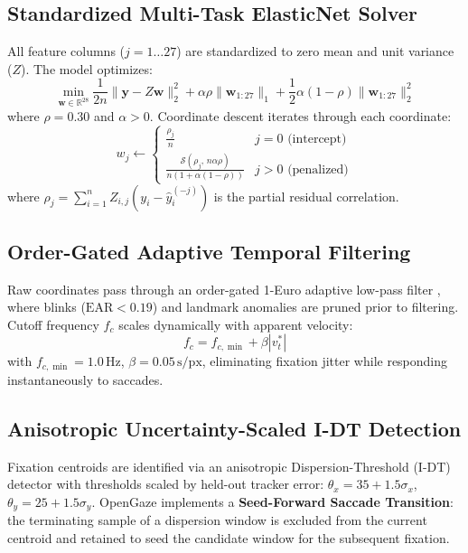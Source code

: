 \documentclass[10pt,twocolumn]{article}
\begin{document}
\subsection{Standardized Multi-Task ElasticNet Solver}
\label{subsec:elasticnet}
All feature columns ($j = 1 \dots 27$) are standardized to zero mean and unit variance ($Z$). The model optimizes:
\begin{equation}
    \min_{\mathbf{w} \in \mathbb{R}^{28}} \frac{1}{2n} \|\mathbf{y} - Z \mathbf{w}\|_2^2 + \alpha \rho \|\mathbf{w}_{1:27}\|_1 + \frac{1}{2} \alpha (1 - \rho) \|\mathbf{w}_{1:27}\|_2^2
\end{equation}
where $\rho = 0.30$ and $\alpha > 0$. Coordinate descent iterates through each coordinate:
\begin{equation}
    w_j \leftarrow \begin{cases} 
    \frac{\rho_j}{n} & j = 0 \text{ (intercept)} \\[6pt]
    \frac{\mathcal{S}\left(\rho_j, \, n \alpha \rho\right)}{n (1 + \alpha (1 - \rho))} & j > 0 \text{ (penalized)}
    \end{cases}
\end{equation}
where $\rho_j = \sum_{i=1}^n Z_{i,j}(y_i - \hat{y}_i^{(-j)})$ is the partial residual correlation.

\subsection{Order-Gated Adaptive Temporal Filtering}
\label{subsec:filter}
Raw coordinates pass through an order-gated 1-Euro adaptive low-pass filter \cite{casiez20121}, where blinks ($\text{EAR} < 0.19$) and landmark anomalies are pruned prior to filtering. Cutoff frequency $f_c$ scales dynamically with apparent velocity:
\begin{equation}
    f_c = f_{c,\min} + \beta |v_t^*|
\end{equation}
with $f_{c,\min} = 1.0\,\text{Hz}$, $\beta = 0.05\,\text{s/px}$, eliminating fixation jitter while responding instantaneously to saccades.

\subsection{Anisotropic Uncertainty-Scaled I-DT Detection}
\label{subsec:fixation}
Fixation centroids are identified via an anisotropic Dispersion-Threshold (I-DT) detector with thresholds scaled by held-out tracker error: $\theta_x = 35 + 1.5 \sigma_x$, $\theta_y = 25 + 1.5 \sigma_y$. OpenGaze implements a \textbf{Seed-Forward Saccade Transition}: the terminating sample of a dispersion window is excluded from the current centroid and retained to seed the candidate window for the subsequent fixation.
\end{document}
